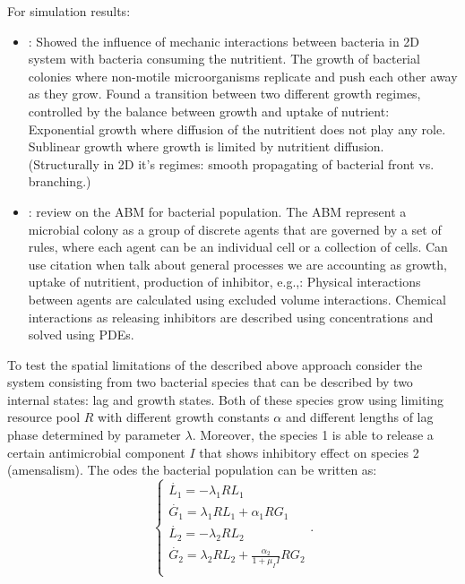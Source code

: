 \documentclass[10pt,A4paper]{article}
\begin{document}
%
For simulation results:
\begin{itemize}
    \item \cite{farrell_mechanically_2013}: Showed the influence of mechanic interactions between bacteria in 2D system with bacteria consuming the nutritient.
    The growth of bacterial colonies where non-motile microorganisms replicate and push each other away as they grow.
    Found a transition between two different growth regimes, controlled by the balance between growth and uptake of nutrient:\\
    Exponential growth where diffusion of the nutritient does not play any role. Sublinear growth where growth is limited by nutritient diffusion.
    (Structurally in 2D it's regimes: smooth propagating of bacterial front vs. branching.)
    \item \cite{nagarajan_agent-based_2022-1}: review on the ABM for bacterial population.
    The ABM represent a microbial colony as a group of discrete agents that are governed by a set of rules, where each agent can be an individual cell or a collection of cells.
    Can use citation when talk about general processes we are accounting as growth, uptake of nutritient, production of inhibitor, e.g.,:
    Physical interactions between agents are calculated using excluded volume interactions.
    Chemical interactions as releasing inhibitors are described using concentrations and solved using PDEs.
\end{itemize}
%
To test the spatial limitations of the described above approach consider the system consisting from two bacterial species that can be described by two internal states: lag and growth states. 
Both of these species grow using limiting resource pool $R$ with different growth constants $\alpha$ and different lengths of lag phase determined by parameter $\lambda$.
Moreover, the species 1 is able to release a certain antimicrobial component $I$ that shows inhibitory effect on species 2 (amensalism).
The \acp{ode} the bacterial population can be written as:
\begin{equation}
    \begin{cases}
        \dot{L_1} = -\lambda_1 R L_1\\
        \dot{G_1} = \lambda_1 R L_1 + \alpha_1 R G_1\\
        \dot{L_2} = -\lambda_2 R L_2\\
        \dot{G_2} = \lambda_2 R L_2 + \frac{\alpha_2}{1 + \mu_I I} R G_2\\
    \end{cases}.
    \label{eq:spatial_limit_F}
\end{equation}
\end{document}
